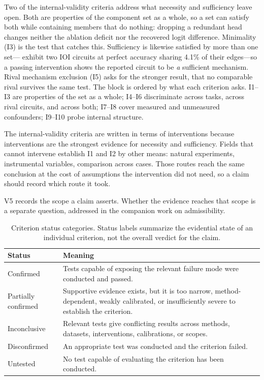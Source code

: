 \documentclass{article}
\begin{document}
Two of the internal-validity criteria address what necessity and sufficiency leave open. Both are properties of the component set as a whole, so a set can satisfy both while containing members that do nothing: dropping a redundant head changes neither the ablation deficit nor the recovered logit difference. Minimality (I3) is the test that catches this. Sufficiency is likewise satisfied by more than one set---\citet{chen2026circuits} exhibit two IOI circuits at perfect accuracy sharing 4.1\% of their edges---so a passing intervention shows the reported circuit to be \emph{a} sufficient mechanism. Rival mechanism exclusion (I5) asks for the stronger result, that no comparable rival survives the same test. The block is ordered by what each criterion asks. I1--I3 are properties of the set as a whole; I4--I6 discriminate across tasks, across rival circuits, and across both; I7--I8 cover measured and unmeasured confounders; I9--I10 probe internal structure.

The internal-validity criteria are written in terms of interventions because interventions are the strongest evidence for necessity and sufficiency. Fields that cannot intervene establish I1 and I2 by other means: natural experiments, instrumental variables, comparison across cases. Those routes reach the same conclusion at the cost of assumptions the intervention did not need, so a claim should record which route it took.

V5 records the scope a claim asserts. Whether the evidence reaches that scope is a separate question, addressed in the companion work on admissibility.


\begingroup
{}
\begin{table}[H]
\centering
\small
\caption{Criterion status categories. Status labels summarize the evidential state of an individual criterion, not the overall verdict for the claim.}
\label{tab:criterion-status}
\renewcommand{\arraystretch}{1.15}
\begin{tabular}{@{}lp{10.5cm}@{}}
\toprule
\textbf{Status} & \textbf{Meaning} \\
\midrule
Confirmed & Tests capable of exposing the relevant failure mode were conducted and passed. \\
\midrule
Partially confirmed  & Supportive evidence exists, but it is too narrow, method-dependent, weakly calibrated, or insufficiently severe to establish the criterion. \\
\midrule
Inconclusive & Relevant tests give conflicting results across methods, datasets, interventions, calibrations, or scopes. \\
\midrule
Disconfirmed & An appropriate test was conducted and the criterion failed. \\
\midrule
Untested & No test capable of evaluating the criterion has been conducted. \\
\bottomrule
\end{tabular}
\end{table}
\endgroup
\end{document}
